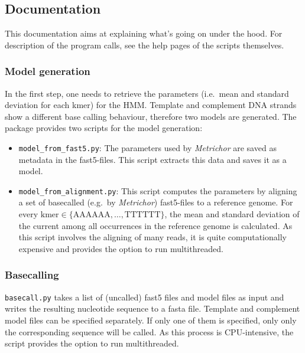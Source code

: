 \documentclass[]{scrartcl}
\begin{document}
\subsection{Documentation}
This documentation aims at explaining what's going on under the hood. For description of the program calls, see the help pages of the scripts themselves. 
 
\subsubsection{Model generation}
In the first step, one needs to retrieve the parameters (i.e.\ mean and standard deviation for each kmer) for the HMM. Template and complement DNA strands show a different base calling behaviour, therefore two models are generated. The package provides two scripts for the model generation: 

\begin{itemize}
\item \texttt{model\_from\_fast5.py}: The parameters used by \textit{Metrichor} are saved as metadata in the fast5-files. This script extracts this data and saves it as a model. 
\item \texttt{model\_from\_alignment.py}: This script computes the parameters by aligning a set of basecalled (e.g.\ by \textit{Metrichor}) fast5-files to a reference genome. For every $\mathrm{kmer} \in \{\mathrm{AAAAAA}, \dots, \mathrm{TTTTTT}\}$, the mean and standard deviation of the current among all occurrences in the reference genome is calculated. As this script involves the aligning of many reads, it is quite computationally expensive and provides the option to run multithreaded. 
\end{itemize}

\subsubsection{Basecalling}
\texttt{basecall.py} takes a list of (uncalled) fast5 files and model files as input and writes the resulting nucleotide sequence to a fasta file. Template and complement model files can be specified separately. If only one of them is specified, only only the corresponding sequence will be called. As this process is CPU-intensive, the script provides the option to run multithreaded. 
\end{document}
